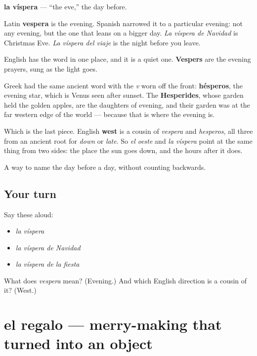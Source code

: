 \begin{cousinweb}
\textbf{la víspera} — \textquotedblleft{}the eve,\textquotedblright{} the day before.

Latin \textbf{vespera} is the evening. Spanish narrowed it to a particular evening: not any evening, but the one that leans on a bigger day. \emph{La víspera de Navidad} is Christmas Eve. \emph{La víspera del viaje} is the night before you leave.

English has the word in one place, and it is a quiet one. \textbf{Vespers} are the evening prayers, sung as the light goes.

Greek had the same ancient word with the \emph{v} worn off the front: \textbf{hésperos}, the evening star, which is Venus seen after sunset. The \textbf{Hesperides}, whose garden held the golden apples, are the daughters of evening, and their garden was at the far western edge of the world — because that is where the evening is.

Which is the last piece. English \textbf{west} is a cousin of \emph{vespera} and \emph{hesperos}, all three from an ancient root for \emph{down} or \emph{late}. So \emph{el oeste} and \emph{la víspera} point at the same thing from two sides: the place the sun goes down, and the hours after it does.
\end{cousinweb}

\begin{grammarlens}[title={What you've built}]
A way to name the day before a day, without counting backwards.
\end{grammarlens}

\subsection*{Your turn}
Say these aloud:

\begin{itemize}
\raggedright
  \item \emph{la víspera}
  \item \emph{la víspera de Navidad}
  \item \emph{la víspera de la fiesta}
\end{itemize}

\begin{tcolorbox}[breakable,colback=teal!4,colframe=teal!35!black,title={Before you move on}]
What does \emph{vespera} mean? (Evening.) And which English direction is a cousin of it? (West.)
\end{tcolorbox}
\section[el regalo]{el regalo — merry-making that turned into an object}

